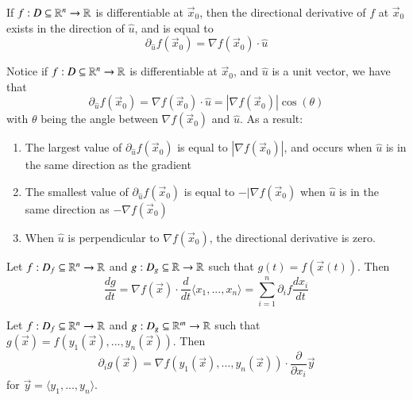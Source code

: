 \begin{appendices}
    \begin{thm}
        If $f:D\subseteq \mathbb R^n\rightarrow \mathbb R$ is differentiable at $\vec{x}_0$, then the directional derivative of $f$ at $\vec{x}_0$ exists in the direction of $\hat{u}$, and is equal to \begin{equation}
            \partial_{\hat{u}}f(\vec{x}_0) = \nabla f(\vec{x}_0) \cdot \hat{u}
        \end{equation}
    \end{thm}


    \begin{thm}
        Notice if $f:D\subseteq \mathbb R^n\rightarrow \mathbb R$ is differentiable at $\vec{x}_0$, and $\hat{u}$ is a unit vector, we have that \begin{equation}
            \partial_{\hat{u}}f(\vec{x}_0) = \nabla f(\vec{x}_0) \cdot \hat{u} = |\nabla f(\vec{x}_0)|\cos(\theta)
        \end{equation}
        with $\theta$ being the angle between $\nabla f(\vec{x}_0)$ and $\hat{u}$. As a result: \begin{enumerate}
            \item The largest value of $\partial_{\hat{u}}f(\vec{x}_0)$ is equal to $|\nabla f(\vec{x}_0)|$, and occurs when $\hat{u}$ is in the same direction as the gradient
            \item The smallest value of $\partial_{\hat{u}}f(\vec{x}_0)$ is equal to $-|\nabla f(\vec{x}_0)$ when $\hat{u}$ is in the same direction as $-\nabla f(\vec{x}_0)$
            \item When $\hat{u}$ is perpendicular to $\nabla f(\vec{x}_0)$, the directional derivative is zero.
        \end{enumerate}
    \end{thm}

    \begin{thm}
        Let $f:D_f\subseteq \mathbb R^n\rightarrow \mathbb R$ and $g:D_g\subseteq \mathbb R\rightarrow \mathbb R$ such that $g(t) = f(\vec{x}(t))$. Then \begin{equation}
            \frac{dg}{dt} = \nabla f(\vec{x}) \cdot \frac{d}{dt}\langle x_1,...,x_n\rangle = \sum_{i=1}^n \partial_i f\frac{dx_i}{dt}
        \end{equation}
    \end{thm}

    \begin{thm}
        Let $f:D_f\subseteq \mathbb R^n\rightarrow \mathbb R$ and $g:D_g\subseteq \mathbb R^m\rightarrow \mathbb R$ such that $g(\vec{x}) = f(y_1(\vec{x}),...,y_n(\vec{x}))$. Then \begin{equation}
        \partial_i g(\vec{x}) = \nabla f(y_1(\vec{x}),...,y_n(\vec{x})) \cdot \frac{\partial}{\partial x_i}\vec{y}
        \end{equation}
        for $\vec{y} = \langle y_1,...,y_n\rangle$.
    \end{thm}



\end{appendices}
